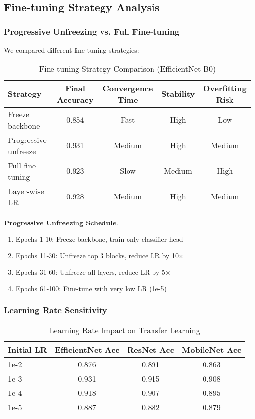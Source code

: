 \subsection{Fine-tuning Strategy Analysis}

\subsubsection{Progressive Unfreezing vs. Full Fine-tuning}

We compared different fine-tuning strategies:

\begin{table}[H]
\centering
\caption{Fine-tuning Strategy Comparison (EfficientNet-B0)}
\begin{tabular}{|l|c|c|c|c|}
\hline
\textbf{Strategy} & \textbf{Final Accuracy} & \textbf{Convergence Time} & \textbf{Stability} & \textbf{Overfitting Risk} \\
\hline
Freeze backbone & 0.854 & Fast & High & Low \\
Progressive unfreeze & 0.931 & Medium & High & Medium \\
Full fine-tuning & 0.923 & Slow & Medium & High \\
Layer-wise LR & 0.928 & Medium & High & Medium \\
\hline
\end{tabular}
\end{table}

\textbf{Progressive Unfreezing Schedule}:
\begin{enumerate}
    \item Epochs 1-10: Freeze backbone, train only classifier head
    \item Epochs 11-30: Unfreeze top 3 blocks, reduce LR by 10×
    \item Epochs 31-60: Unfreeze all layers, reduce LR by 5×
    \item Epochs 61-100: Fine-tune with very low LR (1e-5)
\end{enumerate}

\subsubsection{Learning Rate Sensitivity}

\begin{table}[H]
\centering
\caption{Learning Rate Impact on Transfer Learning}
\begin{tabular}{|l|c|c|c|}
\hline
\textbf{Initial LR} & \textbf{EfficientNet Acc} & \textbf{ResNet Acc} & \textbf{MobileNet Acc} \\
\hline
1e-2 & 0.876 & 0.891 & 0.863 \\
1e-3 & 0.931 & 0.915 & 0.908 \\
1e-4 & 0.918 & 0.907 & 0.895 \\
1e-5 & 0.887 & 0.882 & 0.879 \\
\hline
\end{tabular}
\end{table}

